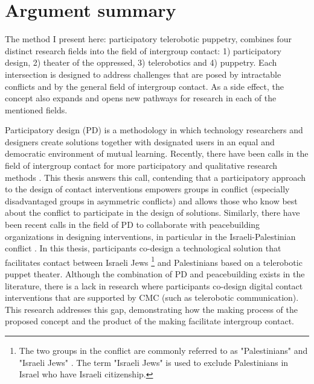 \documentclass[dissertation,math,vertlayout,pdfa,colorlinks,nologo]{aaltoseries}
\begin{document}
\section{Argument summary}
The method I present here: participatory telerobotic puppetry, combines four distinct research fields into the field of intergroup contact: 1) participatory design, 2) theater of the oppressed, 3) telerobotics and 4) puppetry. Each intersection is designed to address challenges that are posed by intractable conflicts and by the general field of intergroup contact. As a side effect, the concept also expands and opens new pathways for research in each of the mentioned fields.

Participatory design (PD) \cite{disalvoCommunitiesParticipatoryDesign2012} is a methodology in which technology researchers and designers create solutions together with designated users in an equal and democratic environment of mutual learning. Recently, there have been calls in the field of intergroup contact for more participatory and qualitative research methods \cite{dixonNegativeContactCollective2021}. This thesis answers this call, contending that a participatory approach to the design of contact interventions empowers groups in conflict (especially disadvantaged groups in asymmetric conflicts) and allows those who know best about the conflict to participate in the design of solutions. Similarly, there have been recent calls in the field of PD to collaborate with peacebuilding organizations in designing interventions, in particular in the Israeli-Palestinian conflict \cite{bodkerAfterthoughtsEmergentFuture2025}. In this thesis, participants co-design a technological solution that facilitates contact between Israeli Jews \footnote{The two groups in the conflict are commonly referred to as "Palestinians" and "Israeli Jews" \cite{maozDoesContactWork2011}. The term "Israeli Jews" is used to exclude Palestinians in Israel who have Israeli citizenship.} and Palestinians based on a telerobotic puppet theater. Although the combination of PD and peacebuilding exists in the literature, there is a lack in research where participants co-design digital contact interventions that are supported by CMC (such as telerobotic communication). This research addresses this gap, demonstrating how the making process of the proposed concept and the product of the making facilitate intergroup contact.
\end{document}
